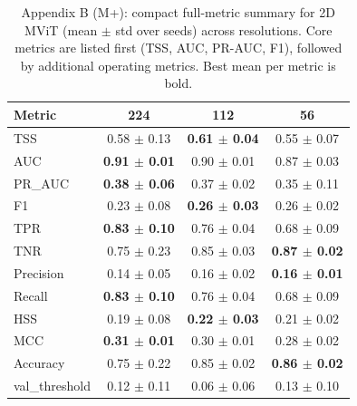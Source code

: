 \begin{table}[p]
\centering
\footnotesize
\setlength{\tabcolsep}{4pt}
\caption{Appendix B (M+): compact full-metric summary for 2D MViT (mean $\pm$ std over seeds) across resolutions. Core metrics are listed first (TSS, AUC, PR-AUC, F1), followed by additional operating metrics. Best mean per metric is bold.}
\label{tab:appB_compact_mplus}
\begin{tabular}{lccc}
\toprule
Metric & 224 & 112 & 56 \\
\midrule
TSS & 0.58 $\pm$ 0.13 & \textbf{0.61 $\pm$ 0.04} & 0.55 $\pm$ 0.07 \\
AUC & \textbf{0.91 $\pm$ 0.01} & 0.90 $\pm$ 0.01 & 0.87 $\pm$ 0.03 \\
PR\_AUC & \textbf{0.38 $\pm$ 0.06} & 0.37 $\pm$ 0.02 & 0.35 $\pm$ 0.11 \\
F1 & 0.23 $\pm$ 0.08 & \textbf{0.26 $\pm$ 0.03} & 0.26 $\pm$ 0.02 \\
TPR & \textbf{0.83 $\pm$ 0.10} & 0.76 $\pm$ 0.04 & 0.68 $\pm$ 0.09 \\
TNR & 0.75 $\pm$ 0.23 & 0.85 $\pm$ 0.03 & \textbf{0.87 $\pm$ 0.02} \\
Precision & 0.14 $\pm$ 0.05 & 0.16 $\pm$ 0.02 & \textbf{0.16 $\pm$ 0.01} \\
Recall & \textbf{0.83 $\pm$ 0.10} & 0.76 $\pm$ 0.04 & 0.68 $\pm$ 0.09 \\
HSS & 0.19 $\pm$ 0.08 & \textbf{0.22 $\pm$ 0.03} & 0.21 $\pm$ 0.02 \\
MCC & \textbf{0.31 $\pm$ 0.01} & 0.30 $\pm$ 0.01 & 0.28 $\pm$ 0.02 \\
Accuracy & 0.75 $\pm$ 0.22 & 0.85 $\pm$ 0.02 & \textbf{0.86 $\pm$ 0.02} \\
val\_threshold & 0.12 $\pm$ 0.11 & 0.06 $\pm$ 0.06 & 0.13 $\pm$ 0.10 \\
\bottomrule
\end{tabular}
\end{table}
